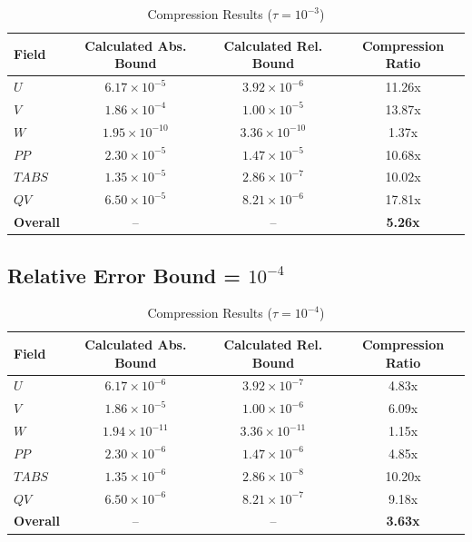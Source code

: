 \documentclass[11pt,a4paper]{article}
\begin{document}
\begin{table}[H]
\centering
\caption{Compression Results ($\tau = 10^{-3}$)}
\begin{tabular}{lccc}
\toprule
\textbf{Field} & \textbf{Calculated Abs. Bound} & \textbf{Calculated Rel. Bound} & \textbf{Compression Ratio} \\
\midrule
$U$ & $6.17 \times 10^{-5}$ & $3.92 \times 10^{-6}$ & 11.26x \\
$V$ & $1.86 \times 10^{-4}$ & $1.00 \times 10^{-5}$ & 13.87x \\
$W$ & $1.95 \times 10^{-10}$ & $3.36 \times 10^{-10}$ & 1.37x \\
$PP$ & $2.30 \times 10^{-5}$ & $1.47 \times 10^{-5}$ & 10.68x \\
$TABS$ & $1.35 \times 10^{-5}$ & $2.86 \times 10^{-7}$ & 10.02x \\
$QV$ & $6.50 \times 10^{-5}$ & $8.21 \times 10^{-6}$ & 17.81x \\
\midrule
\textbf{Overall} & -- & -- & \textbf{5.26x} \\
\bottomrule
\end{tabular}
\end{table}

\subsection{Relative Error Bound = $10^{-4}$}

\begin{table}[H]
\centering
\caption{Compression Results ($\tau = 10^{-4}$)}
\begin{tabular}{lccc}
\toprule
\textbf{Field} & \textbf{Calculated Abs. Bound} & \textbf{Calculated Rel. Bound} & \textbf{Compression Ratio} \\
\midrule
$U$ & $6.17 \times 10^{-6}$ & $3.92 \times 10^{-7}$ & 4.83x \\
$V$ & $1.86 \times 10^{-5}$ & $1.00 \times 10^{-6}$ & 6.09x \\
$W$ & $1.94 \times 10^{-11}$ & $3.36 \times 10^{-11}$ & 1.15x \\
$PP$ & $2.30 \times 10^{-6}$ & $1.47 \times 10^{-6}$ & 4.85x \\
$TABS$ & $1.35 \times 10^{-6}$ & $2.86 \times 10^{-8}$ & 10.20x \\
$QV$ & $6.50 \times 10^{-6}$ & $8.21 \times 10^{-7}$ & 9.18x \\
\midrule
\textbf{Overall} & -- & -- & \textbf{3.63x} \\
\bottomrule
\end{tabular}
\end{table}
\end{document}
